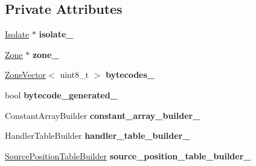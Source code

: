 \subsection*{Private Attributes}
\begin{DoxyCompactItemize}
\item 
\hyperlink{classv8_1_1internal_1_1_isolate}{Isolate} $\ast$ {\bfseries isolate\+\_\+}\hypertarget{classv8_1_1internal_1_1interpreter_1_1_bytecode_array_builder_a5c861b4db88b152593c085dee4cb428b}{}\label{classv8_1_1internal_1_1interpreter_1_1_bytecode_array_builder_a5c861b4db88b152593c085dee4cb428b}

\item 
\hyperlink{classv8_1_1internal_1_1_zone}{Zone} $\ast$ {\bfseries zone\+\_\+}\hypertarget{classv8_1_1internal_1_1interpreter_1_1_bytecode_array_builder_ab296cc8d4b9bb167eeb2a1d29397388f}{}\label{classv8_1_1internal_1_1interpreter_1_1_bytecode_array_builder_ab296cc8d4b9bb167eeb2a1d29397388f}

\item 
\hyperlink{classv8_1_1internal_1_1_zone_vector}{Zone\+Vector}$<$ uint8\+\_\+t $>$ {\bfseries bytecodes\+\_\+}\hypertarget{classv8_1_1internal_1_1interpreter_1_1_bytecode_array_builder_a8ddf7fcfaf0fa41a88d706fd084aa343}{}\label{classv8_1_1internal_1_1interpreter_1_1_bytecode_array_builder_a8ddf7fcfaf0fa41a88d706fd084aa343}

\item 
bool {\bfseries bytecode\+\_\+generated\+\_\+}\hypertarget{classv8_1_1internal_1_1interpreter_1_1_bytecode_array_builder_aeeb2fbe5bd92e59e946ad7312577acc7}{}\label{classv8_1_1internal_1_1interpreter_1_1_bytecode_array_builder_aeeb2fbe5bd92e59e946ad7312577acc7}

\item 
Constant\+Array\+Builder {\bfseries constant\+\_\+array\+\_\+builder\+\_\+}\hypertarget{classv8_1_1internal_1_1interpreter_1_1_bytecode_array_builder_ad189a9e51742cef69647aef76df2af91}{}\label{classv8_1_1internal_1_1interpreter_1_1_bytecode_array_builder_ad189a9e51742cef69647aef76df2af91}

\item 
Handler\+Table\+Builder {\bfseries handler\+\_\+table\+\_\+builder\+\_\+}\hypertarget{classv8_1_1internal_1_1interpreter_1_1_bytecode_array_builder_a6e94637a31eee5c32432678ed56b2f10}{}\label{classv8_1_1internal_1_1interpreter_1_1_bytecode_array_builder_a6e94637a31eee5c32432678ed56b2f10}

\item 
\hyperlink{classv8_1_1internal_1_1interpreter_1_1_source_position_table_builder}{Source\+Position\+Table\+Builder} {\bfseries source\+\_\+position\+\_\+table\+\_\+builder\+\_\+}\hypertarget{classv8_1_1internal_1_1interpreter_1_1_bytecode_array_builder_ae45b62157816f4edca45dc67280737ee}{}\label{classv8_1_1internal_1_1interpreter_1_1_bytecode_array_builder_ae45b62157816f4edca45dc67280737ee}


\end{DoxyCompactItemize}
